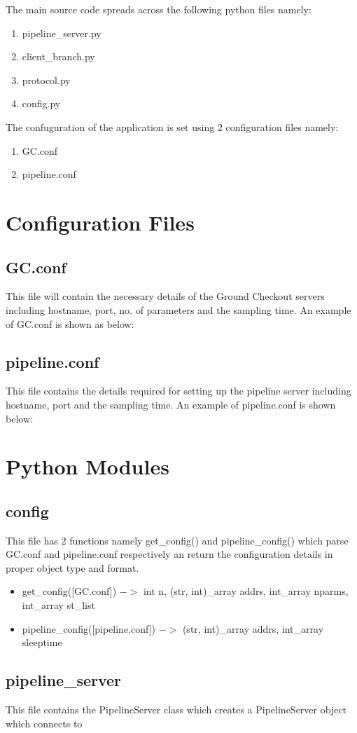 The main source code spreads across the following python files namely:
\begin{enumerate}
	\item pipeline\_server.py
	\item client\_branch.py
	\item protocol.py
	\item config.py
\end{enumerate}
The confuguration of the application is set using 2 configuration files namely:
\begin{enumerate}
	\item GC.conf
	\item pipeline.conf
\end{enumerate}

\section{Configuration Files}

\subsection{GC.conf}
This file will contain the necessary details of the Ground Checkout servers
including hostname, port, no. of parameters and the sampling time. An example
of GC.conf is shown as below:


\subsection{pipeline.conf}
This file contains the details required for setting up the pipeline server
including hostname, port and the sampling time. An example of pipeline.conf is
shown below:



\section{Python Modules}

\subsection{config}
This file has 2 functions namely get\_config() and pipeline\_config() which
parse GC.conf and pipeline.conf respectively an return the configuration
details in proper object type and format.
\begin{itemize}
	\item get\_config([GC.conf]) $->$ int n, (str, int)\_array addrs, int\_array nparms,
		int\_array st\_list
	\item pipeline\_config([pipeline.conf]) $->$ (str, int)\_array addrs, int\_array
		sleeptime
\end{itemize}


\subsection{pipeline\_server}
This file contains the PipelineServer class which creates a PipelineServer
object which connects to

